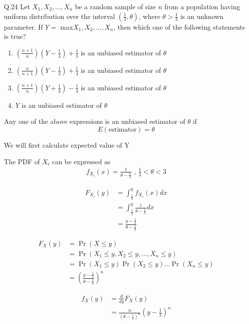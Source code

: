 \documentclass{article}[]
\begin{document}
\let\vec\mathbf

Q.24 Let $X_1, X_2,...,X_n$ be a random sample of size $n$ from a population having uniform distribution over the interval $\left(\frac{1}{3},\theta \right)$, where $\theta>\frac{1}{3}$ is an unknown parameter. If $Y = $ max{$X_1, X_2,...,X_n$}, then which one of the following statements is true?
\begin{enumerate}
\item $\left(\frac{n+1}{n}\right)\left(Y-\frac{1}{3}\right) + \frac{1}{3}$ is an unbiased estimator of $\theta$
\item $\left(\frac{n}{n+1}\right)\left(Y-\frac{1}{3}\right) + \frac{1}{3}$ is an unbiased estimator of $\theta$
\item $\left(\frac{n+1}{n}\right)\left(Y+\frac{1}{3}\right) - \frac{1}{3}$ is an unbiased estimator of $\theta$
\item $Y$ is an unbiased estimator of $\theta$
\end{enumerate} 

\solution

Any one of the above expressions is an unbiased estimator of $\theta$ if 
$$E(\text{estimator})=\theta$$

We will first calculate expected value of Y

The PDF of $X_i$ can be expressed as
\begin{align}
f_{X_i}(x)=\frac{1}{\theta-\frac{1}{3}} \text{ , }  \frac{1}{3}<\theta<3
\end{align}

\begin{align}
F_{X_i}(y)&=\int_{\frac{1}{3}}^{y} f_{X_i}(x) dx \\
&=\int_{\frac{1}{3}}^{y} \frac{1}{\theta-\frac{1}{3}} dx \\
&=\frac{y-\frac{1}{3}}{\theta-\frac{1}{3}}
\end{align}

\begin{align}
F_X(y)&=\Pr(X \leq y)\\
&=\Pr(X_1 \leq y, X_2 \leq y,..., X_n \leq y)\\
&=\Pr(X_1 \leq y)\Pr(X_2 \leq y)...\Pr(X_n \leq y)\\
&=\left(\frac{y-\frac{1}{3}}{\theta-\frac{1}{3}}\right)^n
\end{align}

\begin{align}
f_X(y)&=\frac{d}{dy} F_X(y) \\
&=\frac{n}{\left(\theta-\frac{1}{3}\right)^n} \left(y-\frac{1}{3}\right)^n 
\end{align}
\end{document}
